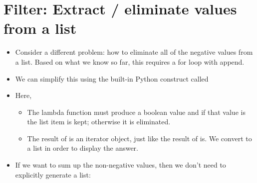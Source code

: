 \documentclass[letterpaper,10pt,english]{sphinxmanual}
\begin{document}
\section{Filter:  Extract / eliminate values from a list}
\label{\detokenize{lecture_notes/lec24_functional:filter-extract-eliminate-values-from-a-list}}\begin{itemize}
\item {} 
Consider a different problem:  how to eliminate all of the negative
values from a list.  Based on what we know so far, this requires a
for loop with append.

\item {} 
We can simplify this using the built-in Python construct
called 

%
\begin{sphinxVerbatim}[commandchars=\\\{\}]
  \PYG{p}{[}       \PYG{p}{]}
    
\end{sphinxVerbatim}

\item {} 
Here,
\begin{itemize}
\item {} 
The lambda function must produce a boolean value and if that
value is  the list item is kept; otherwise it is
eliminated.

\item {} 
The result of  is an iterator object, just like the
result of  is.  We convert to a list in order to display
the answer.

\end{itemize}

\item {} 
If we want to sum up the non-negative values, then we don’t need to
explicitly generate a list:

%
\begin{sphinxVerbatim}[commandchars=\\\{\}]
    
\end{sphinxVerbatim}

\end{itemize}
\end{document}

